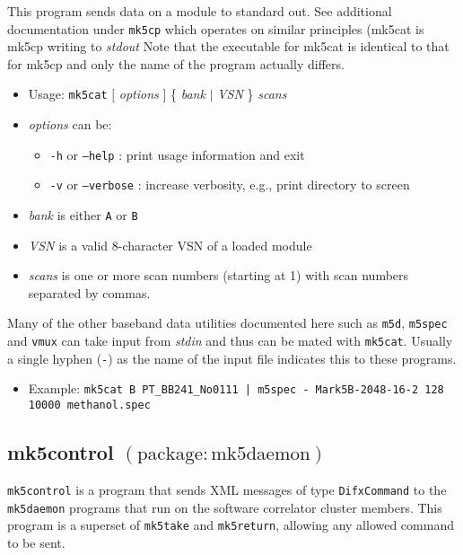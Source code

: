 This program sends data on a module to standard out.
See additional documentation under {\tt mk5cp} which operates on similar principles (mk5cat is mk5cp writing to {\em stdout}
Note that the executable for mk5cat is identical to that for mk5cp and only the name of the program actually differs.

\begin{itemize}
\item[] Usage: {\tt mk5cat} $[$ {\em options} $]$ \{ {\em bank} $\mid$ {\em VSN} \} {\em scans}
\item[] {\em options} can be:
\begin{itemize}
\item[] {\tt -h} or {\tt --help} : print usage information and exit
\item[] {\tt -v} or {\tt --verbose} : increase verbosity, e.g., print directory to screen
\end{itemize}
\item[] {\em bank} is either {\tt A} or {\tt B}
\item[] {\em VSN} is a valid 8-character VSN of a loaded module
\item[] {\em scans} is one or more scan numbers (starting at 1) with scan numbers separated by commas.
\end{itemize}

Many of the other baseband data utilities documented here such as {\tt m5d}, {\tt m5spec} and {\tt vmux} can take input from {\em stdin} and thus can be mated with {\tt mk5cat}.
Usually a single hyphen ({\tt -}) as the name of the input file indicates this to these programs.

\begin{itemize}
\item[] Example: {\tt mk5cat B PT\_BB241\_No0111 | m5spec - Mark5B-2048-16-2 128 10000 methanol.spec}
\end{itemize}






\subsection{mk5control {\small $\mathrm{(package: mk5daemon)}$}} \label{sec:mk5control} 

{\tt mk5control} is a program that sends XML messages of type {\tt DifxCommand} to the {\tt mk5daemon} programs that run on the software correlator cluster members.
This program is a superset of {\tt mk5take} and {\tt mk5return}, allowing any allowed command to be sent.


